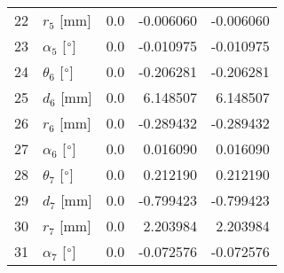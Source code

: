 \documentclass{standalone}%
\begin{document}
\begin{tabular}{llrrr}
22 &              $r_{5}$ [mm] &       0.0 &  -0.006060 &  -0.006060 \\
23 &  $\alpha_{5}$ [$\degree$] &       0.0 &  -0.010975 &  -0.010975 \\
24 &  $\theta_{6}$ [$\degree$] &       0.0 &  -0.206281 &  -0.206281 \\
25 &              $d_{6}$ [mm] &       0.0 &   6.148507 &   6.148507 \\
26 &              $r_{6}$ [mm] &       0.0 &  -0.289432 &  -0.289432 \\
27 &  $\alpha_{6}$ [$\degree$] &       0.0 &   0.016090 &   0.016090 \\
28 &  $\theta_{7}$ [$\degree$] &       0.0 &   0.212190 &   0.212190 \\
29 &              $d_{7}$ [mm] &       0.0 &  -0.799423 &  -0.799423 \\
30 &              $r_{7}$ [mm] &       0.0 &   2.203984 &   2.203984 \\
31 &  $\alpha_{7}$ [$\degree$] &       0.0 &  -0.072576 &  -0.072576 \\
\bottomrule
\end{tabular}
%
\end{document}
